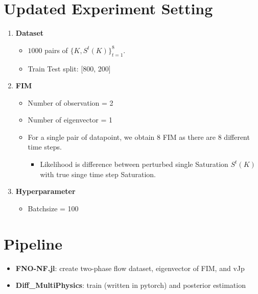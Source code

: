 \documentclass[
]{article}
\providecommand{\tightlist}{%
  \setlength{\itemsep}{0pt}\setlength{\parskip}{0pt}}\usepackage{longtable,booktabs,array}
\begin{document}
\section{Updated Experiment Setting}\label{updated-experiment-setting}

\begin{enumerate}
\def\labelenumi{\arabic{enumi}.}
\tightlist
\item
  \textbf{Dataset}

  \begin{itemize}
  \tightlist
  \item
    \(1000\) pairs of \(\{K, S^t(K)\}_{t=1}^8\).
  \item
    Train Test split: {[}800, 200{]}
  \end{itemize}
\item
  \textbf{FIM}

  \begin{itemize}
  \tightlist
  \item
    Number of observation = 2
  \item
    Number of eigenvector = 1
  \item
    For a single pair of datapoint, we obtain 8 FIM as there are 8
    different time steps.

    \begin{itemize}
    \tightlist
    \item
      Likelihood is difference between perturbed single Saturation
      \(S^t(K)\) with true singe time step Saturation.
    \end{itemize}
  \end{itemize}
\item
  \textbf{Hyperparameter}

  \begin{itemize}
  \tightlist
  \item
    Batchsize = 100
  \end{itemize}
\end{enumerate}

\section{Pipeline}\label{pipeline}

\begin{itemize}
\tightlist
\item
  \textbf{FNO-NF.jl}: create two-phase flow dataset, eigenvector of FIM,
  and vJp
\item
  \textbf{Diff\_MultiPhysics}: train (written in pytorch) and posterior
  estimation
\end{itemize}
\end{document}
